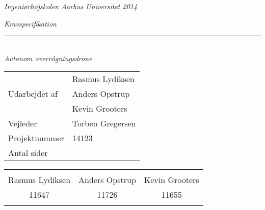 \thispagestyle{empty}

\begin{center}
\textsl{Ingeniørhøjskolen Aarhus Universitet 2014 } \\ \vspace{0.5cm}

\phantom{hul}
\phantom{hul}
\phantom{hul}
\phantom{hul}
\phantom{hul}
\phantom{hul}
\phantom{hul}

\textsl{\HUGE Kravspecifikation } \\ \vspace{0cm}
\rule{15cm}{0.5mm}  \\ \vspace{0.5cm}
\textsl{\LARGE Autonom overvågningsdrone } \\ \vspace{0.5cm}

\vspace{2.5cm}

\begin{table}[h]
\begin{tabular}{l|l}
\hline

 						&	Rasmus Lydiksen 				\\
Udarbejdet af \hspace{5cm} &	Anders Opstrup  \hspace{3.8cm}	\\
 						&  	Kevin Grooters					\\ \hline

Vejleder				&	Torben Gregersen 				\\ \hline
Projektnummer			&	14123 			 				\\ \hline
Antal sider				&	\pageref{LastPage} 				\\ \hline
\end{tabular}
\end{table}

\vspace{8cm}

\begin{table}[H]
	\centering
		\begin{tabular}{c c c}
			\underline{\phantom{mmmmmmmmmmmmmm}} & \underline{\phantom{mmmmmmmmmmmmmm}} & \underline{\phantom{mmmmmmmmmmmmmm}} \\
			Rasmus Lydiksen			& Anders Opstrup 		& Kevin Grooters 			\\
			11647					& 11726					& 11655\\
			&&\\												
		\end{tabular}
\end{table}
\end{center}